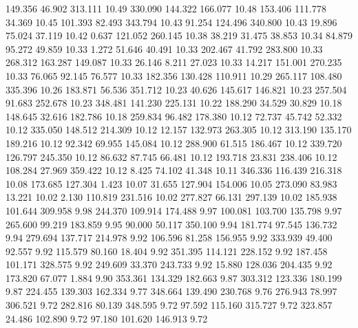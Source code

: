  149.356   46.902  313.111        10.49
 330.090  144.322  166.077        10.48
 153.406  111.778   34.369        10.45
 101.393   82.493  343.794        10.43
  91.254  124.496  340.800        10.43
  19.896   75.024   37.119        10.42
   0.637  121.052  260.145        10.38
  38.219   31.475   38.853        10.34
  84.879   95.272   49.859        10.33
   1.272   51.646   40.491        10.33
 202.467   41.792  283.800        10.33
 268.312  163.287  149.087        10.33
  26.146    8.211   27.023        10.33
  14.217  151.001  270.235        10.33
  76.065   92.145   76.577        10.33
 182.356  130.428  110.911        10.29
 265.117  108.480  335.396        10.26
 183.871   56.536  351.712        10.23
  40.626  145.617  146.821        10.23
 257.504   91.683  252.678        10.23
 348.481  141.230  225.131        10.22
 188.290   34.529   30.829        10.18
 148.645   32.616  182.786        10.18
 259.834   96.482  178.380        10.12
  72.737   45.742   52.332        10.12
 335.050  148.512  214.309        10.12
  12.157  132.973  263.305        10.12
 313.190  135.170  189.216        10.12
  92.342   69.955  145.084        10.12
 288.900   61.515  186.467        10.12
 339.720  126.797  245.350        10.12
  86.632   87.745   66.481        10.12
 193.718   23.831  238.406        10.12
 108.284   27.969  359.422        10.12
   8.425   74.102   41.348        10.11
 346.336  116.439  216.318        10.08
 173.685  127.304    1.423        10.07
  31.655  127.904  154.006        10.05
 273.090   83.983   13.221        10.02
   2.130  110.819  231.516        10.02
 277.827   66.131  297.139        10.02
 185.938  101.644  309.958         9.98
 244.370  109.914  174.488         9.97
 100.081  103.700  135.798         9.97
 265.600   99.219  183.859         9.95
  90.000   50.117  350.100         9.94
 181.774   97.545  136.732         9.94
 279.694  137.717  214.978         9.92
 106.596   81.258  156.955         9.92
 333.939   49.400   92.557         9.92
 115.579   80.160   18.404         9.92
 351.395  114.121  228.152         9.92
 187.458  101.171  328.575         9.92
 249.609   33.370  243.733         9.92
  15.880  128.036  204.435         9.92
 173.820   67.077    1.884         9.90
 353.361  134.329  182.663         9.87
 303.312  123.336  180.199         9.87
 224.455  139.303  162.334         9.77
 348.664  139.490  230.768         9.76
 276.943   78.997  306.521         9.72
 282.816   80.139  348.595         9.72
  97.592  115.160  315.727         9.72
 323.857   24.486  102.890         9.72
  97.180  101.620  146.913         9.72
